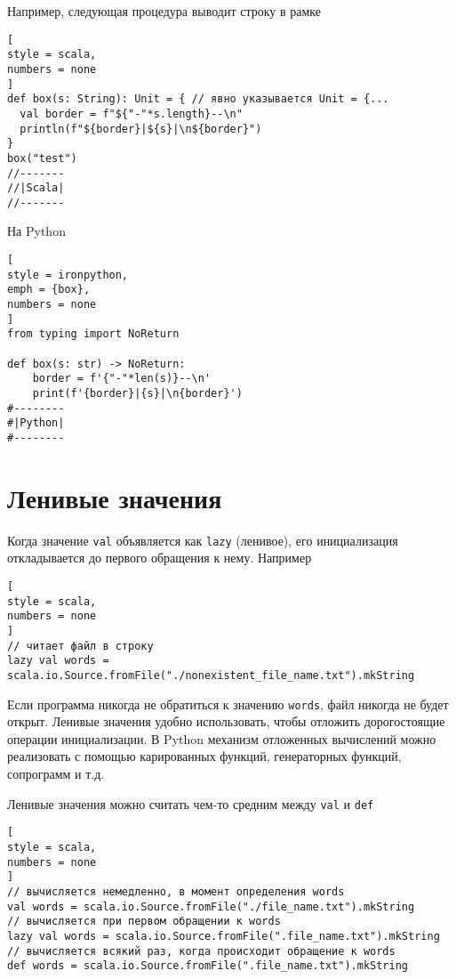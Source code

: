 \documentclass[%
	11pt,
	a4paper,
	utf8,
		]{article}
\begin{document}

Например, следующая процедура выводит строку в рамке
\begin{lstlisting}[
style = scala,
numbers = none
]
def box(s: String): Unit = { // явно указывается Unit = {...
  val border = f"${"-"*s.length}--\n"
  println(f"${border}|${s}|\n${border}")
}
box("test")
//-------
//|Scala|
//-------
\end{lstlisting}

На Python
\begin{lstlisting}[
style = ironpython,
emph = {box},
numbers = none
]
from typing import NoReturn

def box(s: str) -> NoReturn:
    border = f'{"-"*len(s)}--\n'
    print(f'{border}|{s}|\n{border}')
#--------
#|Python|
#--------
\end{lstlisting}

\section{Ленивые значения}

Когда значение \texttt{val} объявляется как \texttt{lazy} (ленивое), его инициализация откладывается до первого обращения к нему. Например
\begin{lstlisting}[
style = scala,
numbers = none
]
// читает файл в строку
lazy val words = scala.io.Source.fromFile("./nonexistent_file_name.txt").mkString
\end{lstlisting}

Если программа никогда не обратиться к значению \texttt{words}, файл никогда не будет открыт. Ленивые значения удобно использовать, чтобы отложить дорогостоящие операции инициализации. В Python механизм отложенных вычислений можно реализовать с помощью карированных функций, генераторных функций, сопрограмм и т.д.

Ленивые значения можно считать чем-то средним между \texttt{val} и \texttt{def}
\begin{lstlisting}[
style = scala,
numbers = none
]
// вычисляется немедленно, в момент определения words
val words = scala.io.Source.fromFile("./file_name.txt").mkString 
// вычисляется при первом обращении к words
lazy val words = scala.io.Source.fromFile(".file_name.txt").mkString
// вычисляется всякий раз, когда происходит обращение к words
def words = scala.io.Source.fromFile(".file_name.txt").mkString
\end{lstlisting}
\end{document}
